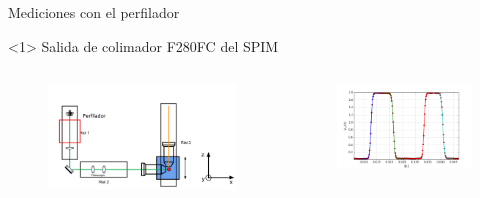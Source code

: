 \begin{frame}{Mediciones con el perfilador}

\begin{onlyenv}<1>
Salida de colimador F280FC del SPIM
\begin{columns}[t]
\begin{column}{0.5\textwidth}
    \begin{figure}[H]
    \centering
    \includegraphics[width=\textwidth]{fig/perfilador/spim_riel_perfilador.png}
    \label{fig:spim_riel_perfilador}
    \end{figure}
\end{column}
%
    \begin{column}{0.5\textwidth}
        \vspace{-2em}
        \begin{figure}[H]
            \centering
            \includegraphics[width=\textwidth]{fig/perfilador/spim_foco_zoom.png}
            \label{fig:spim_foco_zoom}
        \end{figure}
        \vspace{-1em}
        

\end{column}
\end{columns}
\end{onlyenv}
\end{frame}
